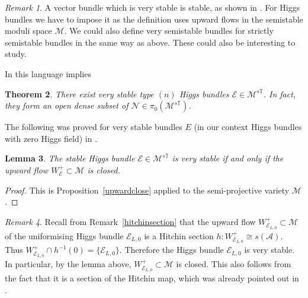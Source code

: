 \documentclass[12pt]{article}
\numberwithin{equation}{section}
\newtheorem{theorem}{Theorem}
\newtheorem{lemma}[theorem]{Lemma}
\theoremstyle{remark}
\newtheorem{remark}[theorem]{Remark}
\theoremstyle{definition}
\numberwithin{theorem}{section}
\def\calE{{\mathcal E}}
\def\calN{{\mathcal{N}}}
\def\M{{\mathcal{M}}}
\def\calA{{\mathcal{A}}}
\newcommand{\T}{{\mathbb{T}}}
\renewcommand{\1}{\mathbbm{1}}
\begin{document}
\begin{remark} A vector  bundle which is very stable is stable, as shown in \cite[Proposition 3.5]{laumon}. For Higgs bundles we have to impose it as the definition uses upward flows in the semistable moduli space $\M$. We could also define very semistable bundles for strictly semistable bundles in the same way as above. These could also be interesting to study. 
	\end{remark}

In this language \cite[Proposition 3.5]{laumon} implies \begin{theorem} \label{laumon} There exist very stable type $(n)$ Higgs bundles $\calE\in \M^{s\T}$. In fact, they form an open dense subset of $\calN\in \pi_0(\M^{s\T})$. 
\end{theorem}
The following was proved for very stable bundles $E$ (in our context Higgs bundles with zero Higgs field) in  \cite[Theorem 1.1]{pauly-peon-nieto}.

\begin{lemma}\label{transversal} The stable Higgs bundle $\calE\in \M^{s\T}$ is very stable if and only if the upward flow $W^+_\calE\subset\M$ is closed.
\end{lemma}

\begin{proof}This is Proposition~\ref{upwardclose} applied to the semi-projective variety $\M$.  
\end{proof}

\begin{remark} \label{hsvs}
	Recall from Remark~\ref{hitchinsection} that the upward flow    $W^+_{\calE_{L,0}}\subset\M$ of the uniformising Higgs bundle $\calE_{L,0}$  is  a Hitchin section $h:W^+_{\calE_{L,0}} \cong s(\calA)$. Thus $W^+_{\calE_{L,0}}\cap h^{-1}(0)=\{\calE_{L,0}\}$. Therefore  the  Higgs bundle $\calE_{L,0}$ is very stable. In particular, by the lemma above,  $W^+_{\calE_{{L,0}}}\subset\M$ is closed. This also follows from the fact that it is a section of the Hitchin map, which  was already pointed out in \cite[p. 454]{hitchin-lie}. 
\end{remark}
\end{document}
